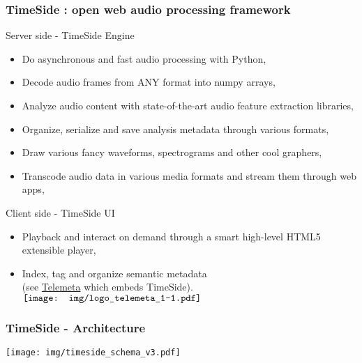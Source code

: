 \documentclass[10pt, final, hyperref, table]{beamer}
\begin{document}
\begin{frame}
 \frametitle{TimeSide : open web audio processing framework}%
\begin{block}{Server side - TimeSide Engine}

  \begin{itemize}
  \item \alert{Do} asynchronous and fast audio processing with Python,
  \item \alert{Decode} audio frames from ANY format into numpy arrays,
  \item \alert{Analyze} audio content with state-of-the-art audio feature extraction libraries,
  \item  \alert{Organize}, serialize and save analysis metadata through various formats,
  \item  \alert{Draw} various fancy waveforms, spectrograms and other cool graphers,
  \item  \alert{Transcode} audio data in various media formats and stream them through web apps,

    \end{itemize}
 
\end{block}
\begin{block}{Client side - TimeSide UI}
  \begin{itemize}
  \item   \alert{Playback} and  \alert{interact} on demand through a smart high-level HTML5 extensible player,
  \item   \alert{Index},  \alert{tag} and  \alert{organize semantic metadata} \\
(see \href{http://telemeta.org/}{Telemeta} which embeds TimeSide). 
\hfill $\vcenter{\hbox{\texttt{[image: img/logo\_telemeta\_1-1.pdf]}}}$
  \end{itemize}
\end{block}
\end{frame}

\begin{frame}
  \frametitle{TimeSide - Architecture}
  \begin{center}
    \texttt{[image: img/timeside\_schema\_v3.pdf]}
  \end{center}
\end{frame}
\end{document}
